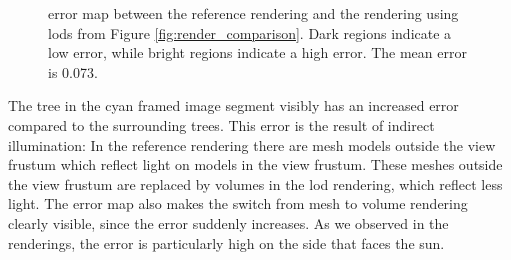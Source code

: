 \begin{figure}[ht]
    \centering
	\caption[\FLIP error map between reference and default \ac{lod} heuristic]{\FLIP error map between the reference rendering and the rendering using \acsp{lod} from Figure \ref{fig:render_comparison}. Dark regions indicate a low error, while bright regions indicate a high error. The mean \FLIP error is 0.073.}
	\label{fig:error_map}
\end{figure}
The tree in the cyan framed image segment visibly has an increased error compared to the surrounding trees.
This error is the result of indirect illumination: In the reference rendering there are mesh models outside the view frustum which reflect light on models in the view frustum.
These meshes outside the view frustum are replaced by volumes in the \ac{lod} rendering, which reflect less light.
The error map also makes the switch from mesh to volume rendering clearly visible, since the error suddenly increases.
As we observed in the renderings, the error is particularly high on the side that faces the sun.

